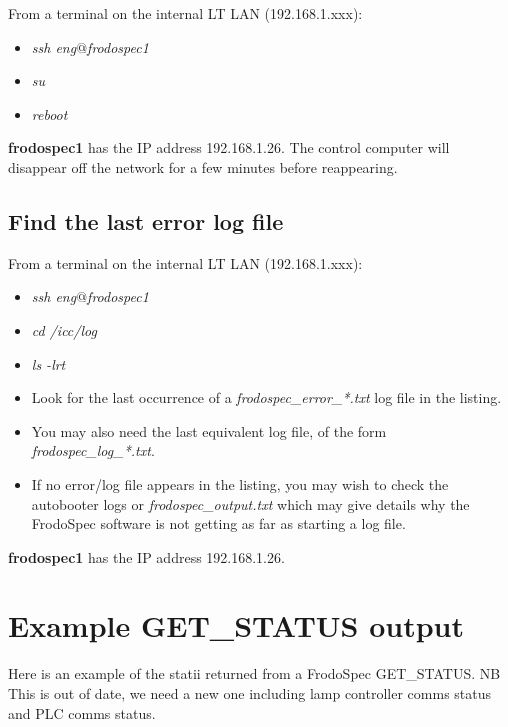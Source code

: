 \documentclass[10pt,a4paper]{article}
\begin{document}
From a terminal on the internal LT LAN (192.168.1.xxx):

\begin{itemize}
\item {\em ssh eng$@$frodospec1}
\item {\em su}
\item {\em reboot}
\end{itemize}

{\bf frodospec1} has the IP address 192.168.1.26.
The control computer will disappear off the network for a few minutes before reappearing.


\subsection{Find the last error log file}
\label{sec:findlasterrorlog}
From a terminal on the internal LT LAN (192.168.1.xxx):

\begin{itemize}
\item {\em ssh eng$@$frodospec1}
\item {\em cd /icc/log}
\item {\em ls -lrt}
\item Look for the last occurrence of a {\em frodospec\_error\_*.txt} log file in the listing.
\item You may also need the last equivalent log file, of the form {\em frodospec\_log\_*.txt}.
\item If no error/log file appears in the listing, you may wish to check the autobooter logs or {\em frodospec\_output.txt} which may give details why the FrodoSpec software is not getting as far as starting a log file.
\end{itemize}

{\bf frodospec1} has the IP address 192.168.1.26.

\section{Example GET\_STATUS output}

Here is an example of the statii returned from a FrodoSpec GET\_STATUS. NB This is out of date, we need
a new one including lamp controller comms status and PLC comms status.
\end{document}
